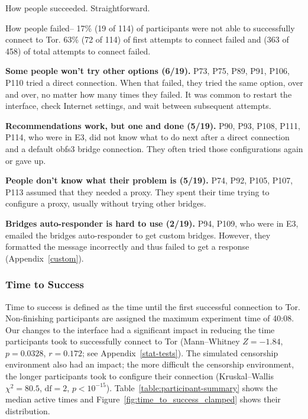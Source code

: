 \documentclass[USenglish,oneside,twocolumn]{article}
\begin{document}
{{How people succeeded. Straightforward. 

How people failed-- 17\% (19 of 114) of participants were not able to successfully connect to Tor. 63\% (72 of 114) of first attempts to connect failed and (363 of 458) of total attempts to connect failed. \\ 

\begin{description}
\item {\bfseries Some people won't try other options (6/19).} P73, P75, P89, P91, P106, P110 tried a direct connection. When that failed, they tried the same option, over and over, no matter how many times they failed. It was common to restart the interface, check Internet settings, and wait between subsequent attempts.

\item {\bfseries Recommendations work, but one and done (5/19).} P90, P93, P108, P111, P114, who were in E3, did not know what to do next after a direct connection and a default obfs3 bridge connection. They often tried those configurations again or gave up. 

\item {\bfseries People don't know what their problem is (5/19).} P74, P92, P105, P107, P113 assumed that they needed a proxy. They spent their time trying to configure a proxy, usually without trying other bridges. 

\item {\bfseries Bridges auto-responder is hard to use (2/19).} P94, P109, who were in E3, emailed the bridges auto-responder to get custom bridges. However, they formatted the message incorrectly and thus failed to get a response (Appendix~\ref{custom}).
\end{description}
} 

\subsubsection{Time to Success} 
Time to success is defined as the time until the first successful connection to Tor. Non-finishing participants are assigned the maximum experiment time of 40:08.  Our changes to the interface had a significant impact in reducing the time participants took to successfully connect to Tor (Mann--Whitney $Z = -1.84$, $p = 0.0328$, $r= 0.172$; see Appendix~\ref{stat-tests}). The simulated censorship environment also had an impact; the more difficult the censorship environment, the longer participants took to configure their connection (Kruskal--Wallis $\chi^2 = 80.5$, $\mbox{df} = 2$, $p < 10^{-15}$). 
Table~\ref{table:participant-summary} shows the median active times and Figure~\ref{fig:time_to_success_clamped} shows their distribution.

}
\end{document}
